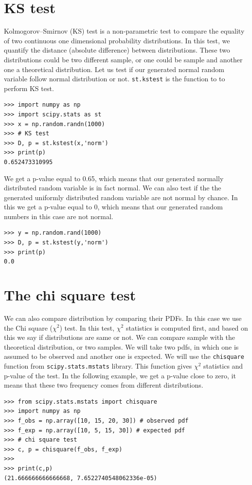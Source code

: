 \documentclass[10pt]{book}
\begin{document}
{\section{KS test}
Kolmogorov–Smirnov (KS) test is a non-parametric test to compare the equality of two continuous one dimensional probability distributions. In this test, we quantify the distance (absolute difference) between distributions. These two distributions could be two different sample, or one could be sample and another one a theoretical distribution. Let us test if our generated normal random variable follow normal distribution or not. \verb"st.kstest" is the function to to perform KS test. 
\beforeverb \begin{verbatim}
>>> import numpy as np
>>> import scipy.stats as st
>>> x = np.random.randn(1000) 
>>> # KS test
>>> D, p = st.kstest(x,'norm')
>>> print(p)
0.652473310995
\end{verbatim} \afterverb
We get a p-value equal to 0.65, which means that our generated normally distributed random variable is in fact normal. We can also test if the the generated uniformly distributed random variable are not normal by chance. In this we get a p-value equal to 0, which means that our generated random numbers in this case are not normal. 
\beforeverb \begin{verbatim}
>>> y = np.random.rand(1000) 
>>> D, p = st.kstest(y,'norm')
>>> print(p)
0.0
\end{verbatim} \afterverb

\section{The chi square test}
We can also compare distribution by comparing their PDFs. In this case we use the Chi square ($\chi^2$) test. In this test, $\chi^2$ statistics is computed first, and based on this we say if distributions are same or not. We can compare sample with the theoretical distribution, or two samples. We will take two pdfs, in which one is assumed to be observed and another one is expected. We will use the \verb"chisquare" function from \verb"scipy.stats.mstats" library. This function gives  $\chi^2$ statistics and p-value of the test. In the following example, we get a p-value close to zero, it means that these two frequency comes from different distributions.
\beforeverb \begin{verbatim}
>>> from scipy.stats.mstats import chisquare
>>> import numpy as np
>>> f_obs = np.array([10, 15, 20, 30]) # observed pdf
>>> f_exp = np.array([10, 5, 15, 30]) # expected pdf
>>> # chi square test
>>> c, p = chisquare(f_obs, f_exp)
>>> 
>>> print(c,p)
(21.666666666666668, 7.6522740548062336e-05)
\end{verbatim} \afterverb

}
\end{document}
